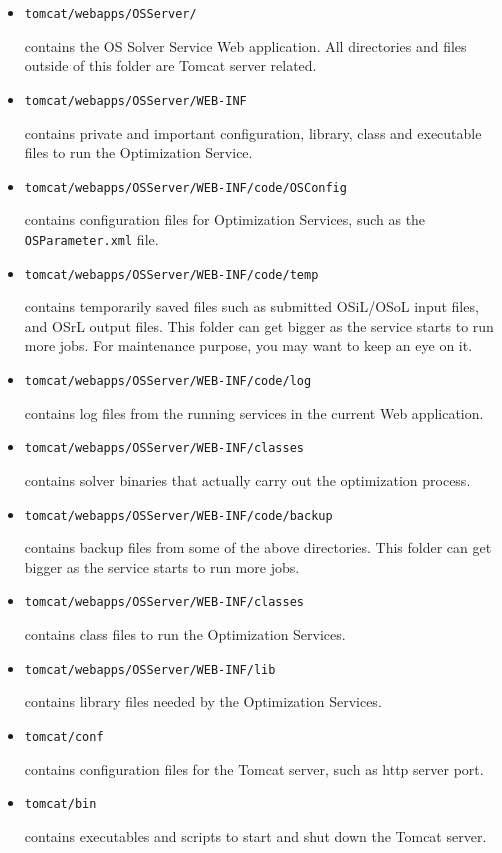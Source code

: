 \begin{itemize}
\item
\begin{verbatim}
tomcat/webapps/OSServer/
\end{verbatim}
contains the OS Solver Service Web application. All directories and files
outside of this folder are Tomcat server related.
\item
\begin{verbatim}
tomcat/webapps/OSServer/WEB-INF
\end{verbatim}
contains private and important configuration, library, class and executable files to run the Optimization Service.

\item
\begin{verbatim}
tomcat/webapps/OSServer/WEB-INF/code/OSConfig
\end{verbatim}
contains configuration files for Optimization Services, such as the {\tt OSParameter.xml} file.
\item
\begin{verbatim}
tomcat/webapps/OSServer/WEB-INF/code/temp
\end{verbatim}
contains temporarily saved files such as submitted OSiL/OSoL input files, and OSrL output files. This folder can get bigger as the service starts to run more jobs. For maintenance purpose, you may want to keep an eye on it.
\item
\begin{verbatim}
tomcat/webapps/OSServer/WEB-INF/code/log
\end{verbatim}
contains log files from the running services in the current Web application.
\item
\begin{verbatim}
tomcat/webapps/OSServer/WEB-INF/classes
\end{verbatim}
contains solver binaries that actually carry out the optimization process.
\item
\begin{verbatim}
tomcat/webapps/OSServer/WEB-INF/code/backup
\end{verbatim}
contains backup files from some of the above directories. This folder can get bigger as the service starts to run more jobs.
\item
\begin{verbatim}
tomcat/webapps/OSServer/WEB-INF/classes
\end{verbatim}
contains class files to run the Optimization Services.
\item
\begin{verbatim}
tomcat/webapps/OSServer/WEB-INF/lib
\end{verbatim}
contains library files needed by the Optimization Services.
\item
\begin{verbatim}
tomcat/conf
\end{verbatim}
contains configuration files for the Tomcat server, such as http server port.
\item
\begin{verbatim}
tomcat/bin
\end{verbatim}
contains executables and scripts to start and shut down the Tomcat server.
\end{itemize}
